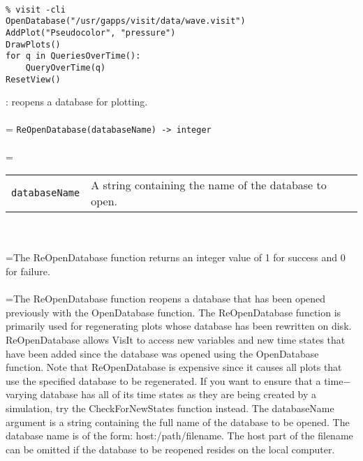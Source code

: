 \documentclass[10pt,a4paper]{report}
\begin{document}
\\[-6mm]
\begin{verbatim}% visit -cli
OpenDatabase("/usr/gapps/visit/data/wave.visit")
AddPlot("Pseudocolor", "pressure")
DrawPlots()
for q in QueriesOverTime():
    QueryOverTime(q)
ResetView()
\end{verbatim}
\newpage


{}
: reopens a database for plotting.\\[-3mm]

 \\ 
\hangindent=\parindent 
\verb!ReOpenDatabase(databaseName) -> integer!\\ [-3mm]

 \\ 
\hangindent=\parindent 
\begin{tabular}{lp{9cm}}
\verb!databaseName! & A string containing the name of the database to open. \\
\end{tabular} \\[-2mm]


 \\ 
\hangindent=\parindent The ReOpenDatabase function returns an integer value of 1 for success and 0 for failure. \\[-3mm] 

 \\ 
\hangindent=\parindent The ReOpenDatabase function reopens a database that has been opened previously with the OpenDatabase function. The ReOpenDatabase function is primarily used for regenerating plots whose database has been rewritten on disk. ReOpenDatabase allows VisIt to access new variables and new time states that have been added since the database was opened using the OpenDatabase function. Note that ReOpenDatabase is expensive since it causes all plots that use the specified database to be regenerated. If you want to ensure that a time$-$varying database has all of its time states as they are being created by a simulation, try the CheckForNewStates function instead. The databaseName argument is a string containing the full name of the database to be opened. The database name is of the form: host:/path/filename. The host part of the filename can be omitted if the database to be reopened resides on the local computer. \\[-3mm] 
\end{document}
